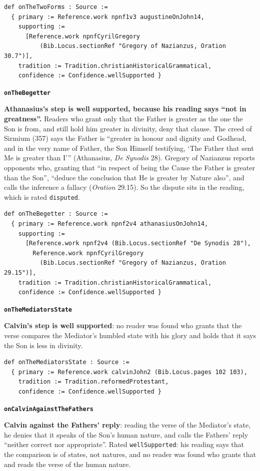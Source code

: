 \documentclass[11pt,paper=\testimonypaper,DIV=13,parskip=false]{scrartcl}
\begin{document}
{\small\begin{verbatim}
def onTheTwoForms : Source :=
  { primary := Reference.work npnf1v3 augustineOnJohn14,
    supporting :=
      [Reference.work npnfCyrilGregory
          (Bib.Locus.sectionRef "Gregory of Nazianzus, Oration 30.7")],
    tradition := Tradition.christianHistoricalGrammatical,
    confidence := Confidence.wellSupported }
\end{verbatim}}
\par\medskip\noindent\textbf{\texttt{on\allowbreak{}The\allowbreak{}Begetter}}\par\nobreak\noindent
\textbf{Athanasius’s step is well supported, because his reading says “not in greatness”.} Readers who grant only that the Father is greater as the one the Son is from, and still hold him greater in divinity, deny that clause. The creed of Sirmium (357) says the Father is “greater in honour and dignity and Godhead, and in the very name of Father, the Son Himself testifying, ‘The Father that sent Me is greater than I’” (Athanasius, \emph{De Synodis} 28). Gregory of Nazianzus reports opponents who, granting that “in respect of being the Cause the Father is greater than the Son”, “deduce the conclusion that He is greater by Nature also”, and calls the inference a fallacy (\emph{Oration} 29.15). So the dispute sits in the reading, which is rated \texttt{disputed}.

{\small\begin{verbatim}
def onTheBegetter : Source :=
  { primary := Reference.work npnf2v4 athanasiusOnJohn14,
    supporting :=
      [Reference.work npnf2v4 (Bib.Locus.sectionRef "De Synodis 28"),
        Reference.work npnfCyrilGregory
          (Bib.Locus.sectionRef "Gregory of Nazianzus, Oration 29.15")],
    tradition := Tradition.christianHistoricalGrammatical,
    confidence := Confidence.wellSupported }
\end{verbatim}}
\par\medskip\noindent\textbf{\texttt{on\allowbreak{}The\allowbreak{}Mediators\allowbreak{}State}}\par\nobreak\noindent
\textbf{Calvin’s step is well supported}: no reader was found who grants that the verse compares the Mediator’s humbled state with his glory and holds that it says the Son is less in divinity.

{\small\begin{verbatim}
def onTheMediatorsState : Source :=
  { primary := Reference.work calvinJohn2 (Bib.Locus.pages 102 103),
    tradition := Tradition.reformedProtestant,
    confidence := Confidence.wellSupported }
\end{verbatim}}
\par\medskip\noindent\textbf{\texttt{on\allowbreak{}Calvin\allowbreak{}Against\allowbreak{}The\allowbreak{}Fathers}}\par\nobreak\noindent
\textbf{Calvin against the Fathers’ reply}: reading the verse of the Mediator’s state, he denies that it speaks of the Son’s human nature, and calls the Fathers’ reply “neither correct nor appropriate”. Rated \texttt{well\allowbreak{}Supported}: his reading says that the comparison is of states, not natures, and no reader was found who grants that and reads the verse of the human nature.
\end{document}
